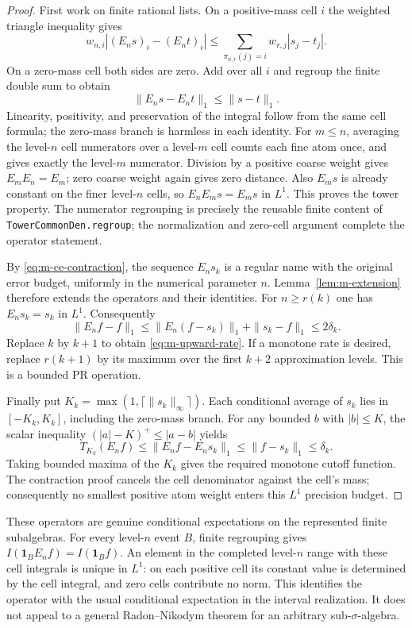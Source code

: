 \begin{proof}
First work on finite rational lists.  On a positive-mass cell $i$ the
weighted triangle inequality gives
\[
 w_{n,i}|(E_ns)_i-(E_nt)_i|
 \le\sum_{\pi_{n,r}(j)=i}w_{r,j}|s_j-t_j|.
\]
On a zero-mass cell both sides are zero.  Add over all $i$ and regroup
the finite double sum to obtain
\begin{equation}
 \|E_ns-E_nt\|_1\le\|s-t\|_1.
 \label{eq:m-ce-contraction}
\end{equation}
Linearity, positivity, and preservation of the integral follow from the
same cell formula; the zero-mass branch is harmless in each identity.
For $m\le n$, averaging the level-$n$ cell numerators over a level-$m$
cell counts each fine atom once, and gives exactly the level-$m$
numerator.  Division by a positive coarse weight gives $E_mE_n=E_m$;
zero coarse weight again gives zero distance.  Also $E_ms$ is already
constant on the finer level-$n$ cells, so $E_nE_ms=E_ms$ in $L^1$.
This proves the tower property.  The numerator regrouping is precisely
the reusable finite content of \texttt{TowerCommonDen.regroup}; the
normalization and zero-cell argument complete the operator statement.

By \eqref{eq:m-ce-contraction}, the sequence $E_ns_k$ is a regular name
with the original error budget, uniformly in the numerical parameter
$n$.  Lemma~\ref{lem:m-extension} therefore extends the operators and
their identities.  For $n\ge r(k)$ one has $E_ns_k=s_k$ in $L^1$.
Consequently
\[
 \|E_nf-f\|_1
 \le\|E_n(f-s_k)\|_1+\|s_k-f\|_1
 \le2\delta_k.
\]
Replace $k$ by $k+1$ to obtain \eqref{eq:m-upward-rate}.  If a monotone
rate is desired, replace $r(k+1)$ by its maximum over the first $k+2$
approximation levels.  This is a bounded PR operation.

Finally put $K_k=\max(1,\lceil\|s_k\|_\infty\rceil)$.  Each conditional
average of $s_k$ lies in $[-K_k,K_k]$, including the zero-mass branch.
For any bounded $b$ with $|b|\le K$, the scalar inequality
$(|a|-K)^+\le|a-b|$ yields
\[
 T_{K_k}(E_nf)\le\|E_nf-E_ns_k\|_1
                    \le\|f-s_k\|_1\le\delta_k.
\]
Taking bounded maxima of the $K_k$ gives the required monotone cutoff
function.  The contraction proof cancels the cell denominator against
the cell's mass; consequently no smallest positive atom weight enters
this $L^1$ precision budget.
\end{proof}

These operators are genuine conditional expectations on the represented
finite subalgebras.  For every level-$n$ event $B$, finite regrouping gives
$I(\mathbf1_BE_nf)=I(\mathbf1_Bf)$.  An element in the completed
level-$n$ range with these cell integrals is unique in $L^1$: on each
positive cell its constant value is determined by the cell integral,
and zero cells contribute no norm.  This identifies the operator with
the usual conditional expectation in the interval realization.
It does not appeal to a general Radon--Nikodym theorem for an arbitrary
sub-$\sigma$-algebra.

